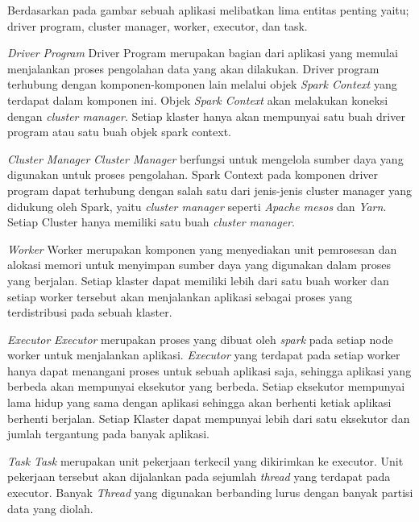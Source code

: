 Berdasarkan pada gambar sebuah aplikasi melibatkan lima entitas penting yaitu; driver program, cluster manager, worker, executor, dan task.
\begin{enumerate}
	\item{\textit{Driver Program}\newline
	Driver Program merupakan bagian dari aplikasi yang memulai menjalankan proses pengolahan 		data yang akan dilakukan. Driver program terhubung dengan komponen-komponen lain melalui 		objek \textit{Spark Context} yang terdapat dalam komponen ini. Objek \textit{Spark Context}
	akan melakukan koneksi dengan \textit{cluster manager}. Setiap klaster hanya akan mempunyai 	satu buah driver program atau satu buah objek spark context. 
	}
	
	\item{\textit{Cluster Manager}\newline
	\textit{Cluster Manager} berfungsi untuk mengelola sumber daya yang digunakan untuk proses 		pengolahan. Spark Context pada komponen driver program dapat terhubung dengan salah satu 		dari jenis-jenis cluster manager yang didukung oleh Spark, yaitu \textit{cluster manager} 		seperti \textit{Apache mesos} dan \textit{Yarn}. Setiap Cluster hanya memiliki satu buah 		\textit{cluster manager}.
	
	\item{\textit{Worker}\newline
	Worker merupakan komponen yang menyediakan unit pemrosesan dan alokasi memori untuk 			menyimpan sumber daya yang digunakan dalam proses yang berjalan. Setiap klaster dapat 			memiliki lebih dari satu buah worker dan setiap worker tersebut akan menjalankan aplikasi 		sebagai proses yang terdistribusi pada sebuah klaster.
	}
	
	\item{\textit{Executor}\newline
	\textit{Executor} merupakan proses yang dibuat oleh \textit{spark} pada setiap node worker 		untuk menjalankan aplikasi. \textit{Executor} yang terdapat pada setiap worker hanya dapat 		menangani proses untuk sebuah aplikasi saja, sehingga aplikasi yang berbeda akan mempunyai 		eksekutor yang berbeda. Setiap eksekutor mempunyai lama hidup yang sama dengan aplikasi 		sehingga akan berhenti ketiak aplikasi berhenti berjalan. Setiap Klaster dapat mempunyai 		lebih dari satu eksekutor dan jumlah tergantung pada banyak aplikasi.
	}
	
	\item{\textit{Task}\newline
	\textit{Task} merupakan unit pekerjaan terkecil yang dikirimkan ke executor. Unit pekerjaan 	tersebut akan dijalankan pada sejumlah \textit{thread} yang terdapat pada executor. Banyak 
	\textit{Thread} yang digunakan berbanding lurus dengan banyak partisi data yang diolah.
	}
		
	}
\end{enumerate}


